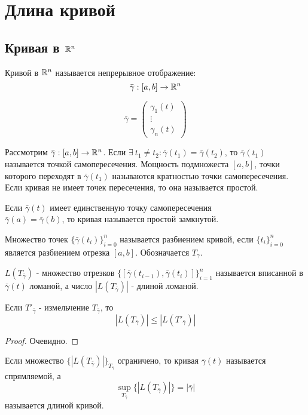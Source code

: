 \section{Длина кривой}
\subsection{Кривая в $\mathbb{R}^n$}

\begin{definition}
    Кривой в $\mathbb{R}^n$ называется непрерывное отображение:
    \[\bar{\gamma}: [a,b]\to \mathbb{R}^n\]
\end{definition} 
\begin{comm}
    \[\bar{\gamma}=\begin{pmatrix}
       \gamma_1(t)\\
       \vdots\\
       \gamma_n(t) 
    \end{pmatrix}\]
\end{comm} 
\begin{definition}
    Рассмотрим $\bar{\gamma}: [a,b]\to \mathbb{R}^n$. Если $\exists\ t_1\ne t_2: \bar{\gamma}(t_1)=\bar{\gamma}(t_2)$, то $\bar{\gamma}(t_1)$ называется точкой самопересечения. Мощность подмножеста $[a,b]$, точки которого переходят в $\bar{\gamma}(t_1)$ называются кратностью точки самопересечения. Если кривая не имеет точек пересечения, то она называется простой.
\end{definition} 
\begin{definition}
    Если $\bar{\gamma}(t)$ имеет единственную точку самопересечения\\
    $\bar{\gamma}(a)=\bar{\gamma}(b)$, то кривая называется простой замкнутой.
\end{definition} 
\begin{definition}
    Множество точек $\{\bar{\gamma}(t_i)\}_{i=0}^n$ называется разбиением кривой, если $\{t_i\}_{i=0}^n$ является разбиением отрезка $[a,b]$. Обозначается $T_{\gamma}$.
\end{definition} 
\begin{definition}
    $L(T_{\bar{\gamma}})$ - множество отрезков $\{[\bar{\gamma}(t_{i-1}),\bar{\gamma}(t_i)]\}_{i=1}^n$ называется вписанной в $\bar{\gamma}(t)$ ломаной, а число $|L(T_{\bar{\gamma}})|$ - длиной ломаной.
\end{definition} 
\begin{statement}
    Если $T'_{\bar{\gamma}}$ - измельчение $T_{\bar{\gamma}}$, то 
    \[|L(T_{\bar{\gamma}})|\leq |L(T'_{\bar{\gamma}})|\]
\end{statement} 
\begin{proof}
    Очевидно.
\end{proof} 
\begin{definition}
    Если множество $\{|L(T_{\bar{\gamma}})|\}_{T_{\bar{\gamma}}}$ ограничено, то кривая $\bar{\gamma}(t)$ называется спрямляемой, а
    \[\sup\limits_{T_{\bar{\gamma}}}\{|L(T_{\bar{\gamma}})|\}=|\bar{\gamma}|\]
    называется длиной кривой.
\end{definition} 
